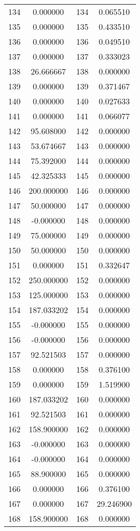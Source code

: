 \documentclass[12pt]{article}
\begin{document}
\begin{longtable}{@{}cccc@{}}
134 & 0.000000 & 134 & 0.065510 \\
135 & 0.000000 & 135 & 0.433510 \\
136 & 0.000000 & 136 & 0.049510 \\
137 & 0.000000 & 137 & 0.333023 \\
138 & 26.666667 & 138 & 0.000000 \\
139 & 0.000000 & 139 & 0.371467 \\
140 & 0.000000 & 140 & 0.027633 \\
141 & 0.000000 & 141 & 0.066077 \\
142 & 95.608000 & 142 & 0.000000 \\
143 & 53.674667 & 143 & 0.000000 \\
144 & 75.392000 & 144 & 0.000000 \\
145 & 42.325333 & 145 & 0.000000 \\
146 & 200.000000 & 146 & 0.000000 \\
147 & 50.000000 & 147 & 0.000000 \\
148 & -0.000000 & 148 & 0.000000 \\
149 & 75.000000 & 149 & 0.000000 \\
150 & 50.000000 & 150 & 0.000000 \\
151 & 0.000000 & 151 & 0.332647 \\
152 & 250.000000 & 152 & 0.000000 \\
153 & 125.000000 & 153 & 0.000000 \\
154 & 187.033202 & 154 & 0.000000 \\
155 & -0.000000 & 155 & 0.000000 \\
156 & -0.000000 & 156 & 0.000000 \\
157 & 92.521503 & 157 & 0.000000 \\
158 & 0.000000 & 158 & 0.376100 \\
159 & 0.000000 & 159 & 1.519900 \\
160 & 187.033202 & 160 & 0.000000 \\
161 & 92.521503 & 161 & 0.000000 \\
162 & 158.900000 & 162 & 0.000000 \\
163 & -0.000000 & 163 & 0.000000 \\
164 & -0.000000 & 164 & 0.000000 \\
165 & 88.900000 & 165 & 0.000000 \\
166 & 0.000000 & 166 & 0.376100 \\
167 & 0.000000 & 167 & 29.246900 \\
168 & 158.900000 & 168 & 0.000000 \\

\end{longtable}
\end{document}

